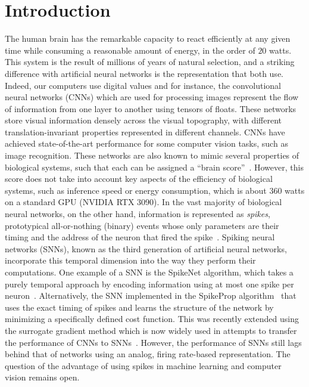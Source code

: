 \documentclass[default]{sn-jnl}%
\theoremstyle{thmstyleone}%
\theoremstyle{thmstyletwo}%
\theoremstyle{thmstylethree}%
\begin{document}
\section{Introduction}
\label{sec:intro}
%
The human brain has the remarkable capacity to react efficiently at any given time while consuming a reasonable amount of energy, in the order of $20$ watts. This system is the result of millions of years of natural selection, and a striking difference with artificial neural networks is the representation that both use. Indeed, our computers use digital values and for instance, the convolutional neural networks (CNNs) which are used for processing images represent the flow of information from one layer to another using tensors of floats. These networks store visual information densely across the visual topography, with different translation-invariant properties represented in different channels. CNNs have achieved state-of-the-art performance for some computer vision tasks, such as image recognition. These networks are also known to mimic several properties of biological systems, such that each can be assigned a ``brain score''~\citep{schrimpf_brain-score_2020}. However, this score does not take into account key aspects of the efficiency of biological systems, such as inference speed or energy consumption, which is about $360$ watts on a standard GPU (NVIDIA RTX 3090). In the vast majority of biological neural networks, on the other hand, information is represented as \emph{spikes}, prototypical all-or-nothing (binary) events whose only parameters are their timing and the address of the neuron that fired the spike~\citep{paugam-moisy_computing_2012}. Spiking neural networks (SNNs), known as the third generation of artificial neural networks, incorporate this temporal dimension into the way they perform their computations. One example of a SNN is the SpikeNet algorithm, which takes a purely temporal approach by encoding information using at most one spike per neuron~\citep{delorme_spikenet_1999}. Alternatively, the SNN implemented in the SpikeProp algorithm~\citep{bohte_error-backpropagation_2002} that uses the exact timing of spikes and learns the structure of the network by minimizing a specifically defined cost function. This was recently extended using the surrogate gradient method which is now widely used in attempts to transfer the performance of CNNs to SNNs~\citep{zenke_remarkable_2021}. However, the performance of SNNs still lags behind that of networks using an analog, firing rate-based representation. The question of the advantage of using spikes in machine learning and computer vision remains open.
\end{document}
